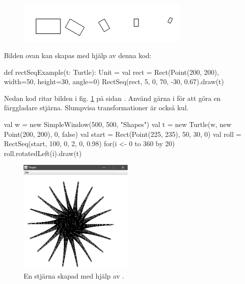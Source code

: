 \begin{figure}[H]
\centering
\includegraphics[width=0.75\textwidth]{../img/turtle/RectSeq.png}
\end{figure}
\noindent Bilden ovan kan skapas med hjälp av denna kod:
\begin{Code}
  def rectSeqExample(t: Turtle): Unit  = {
    val rect = Rect(Point(200, 200), width=50, height=30, angle=0)
    RectSeq(rect, 5, 0, 70, -30, 0.67).draw(t)
  }
\end{Code}

\noindent Nedan kod ritar bilden i fig. \ref{fig:classes:graphics:rectanglesequence} på sidan \pageref{fig:classes:graphics:rectanglesequence}. Använd gärna  i  för att göra en färggladare stjärna. Slumpvisa transformationer är också kul. 

\begin{Code}
val w = new SimpleWindow(500, 500, "Shapes")
val t = new Turtle(w, new Point(200, 200), 0, false)
val start = Rect(Point(225, 235), 50, 30, 0)
val roll = RectSeq(start, 100, 0, 2, 0, 0.98)
for(i <- 0 to 360 by 20) {
  roll.rotatedLeft(i).draw(t)
}
\end{Code}


\begin{figure}
\centering
\includegraphics[width=0.5\textwidth]{../img/w06-lab/RectangleSequence.png}
\caption {En stjärna skapad med hjälp av .}
\label{fig:classes:graphics:rectanglesequence}
\end{figure}

